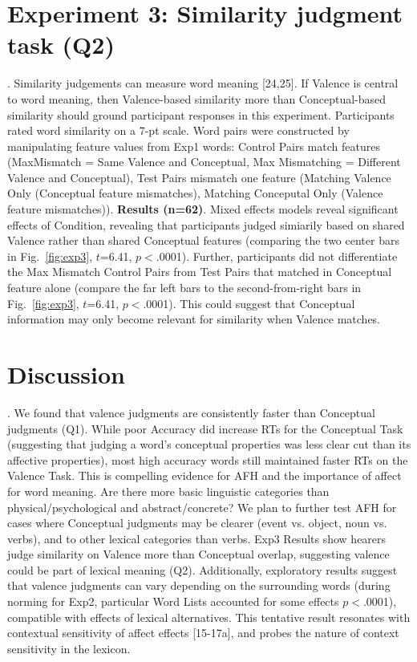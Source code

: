 \section{Experiment 3: Similarity judgment task (Q2)}. Similarity judgements can measure word meaning [24,25]. If Valence is central to word meaning, then Valence-based similarity more than Conceptual-based similarity should ground participant responses in this experiment. Participants rated word similarity on a 7-pt scale. Word pairs were constructed by manipulating feature values from Exp1 words: Control Pairs match features (MaxMismatch = Same Valence and Conceptual, Max Mismatching = Different Valence and Conceptual), Test Pairs mismatch one feature (Matching Valence Only (Conceptual feature mismatches), Matching Conceputal Only (Valence feature mismatches)). \textbf{Results (n=62)}. Mixed effects models reveal significant effects of Condition, revealing that participants judged simiarily based on shared Valence rather than shared Conceptual features (comparing the two center bars in Fig.~\ref{fig:exp3}, $t$=6.41, $p<$.0001). Further, participants did not differentiate the Max Mismatch Control Pairs from Test Pairs that matched in Conceptual feature alone (compare the far left bars to the second-from-right bars in Fig.~\ref{fig:exp3}, $t$=6.41, $p<$.0001). This could suggest that Conceptual information may only become relevant for similarity when Valence matches. \\


\section{Discussion}.
We found that valence judgments are consistently faster than Conceptual judgments (Q1). While poor Accuracy did increase RTs for the Conceptual Task (suggesting that judging a word's conceptual properties was less clear cut than its affective properties), most high accuracy words still maintained faster RTs on the Valence Task. This is compelling evidence for AFH and the importance of affect for word meaning. Are there more basic linguistic categories than physical/psychological and abstract/concrete? We plan to further test AFH for cases where Conceptual judgments may be clearer (event vs. object, noun vs. verbs), and to other lexical categories than verbs. Exp3 Results show hearers judge similarity on Valence more than Conceptual overlap, suggesting valence could be part of lexical meaning (Q2). Additionally, exploratory results suggest that valence judgments can vary depending on the surrounding words (during norming for Exp2, particular Word Lists accounted for some effects %
$p<$.0001), compatible with effects of lexical alternatives. This tentative result resonates with contextual sensitivity of affect effects [15-17a], and probes the nature of context sensitivity in the lexicon.

